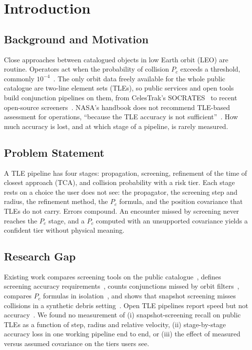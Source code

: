 \documentclass[conference]{IEEEtran}
\begin{document}
\section{Introduction}

\subsection{Background and Motivation}
Close approaches between catalogued objects in low Earth orbit (LEO) are routine. Operators act when the probability of collision $P_c$ exceeds a threshold, commonly $10^{-4}$~\cite{nasa_ca_handbook2020,merz2019}. The only orbit data freely available for the whole public catalogue are two-line element sets (TLEs), so public services and open tools build conjunction pipelines on them, from CelesTrak's SOCRATES~\cite{kelso2005socrates} to recent open-source screeners~\cite{sonawane2026}. NASA's handbook does not recommend TLE-based assessment for operations, ``because the TLE accuracy is not sufficient''~\cite{nasa_ca_handbook2020}. How much accuracy is lost, and at which stage of a pipeline, is rarely measured.

\subsection{Problem Statement}
A TLE pipeline has four stages: propagation, screening, refinement of the time of closest approach (TCA), and collision probability with a risk tier. Each stage rests on a choice the user does not see: the propagator, the screening step and radius, the refinement method, the $P_c$ formula, and the position covariance that TLEs do not carry. Errors compound. An encounter missed by screening never reaches the $P_c$ stage, and a $P_c$ computed with an unsupported covariance yields a confident tier without physical meaning.

\subsection{Research Gap}
Existing work compares screening tools on the public catalogue~\cite{georgeharvey2011}, defines screening accuracy requirements~\cite{auman2025}, counts conjunctions missed by orbit filters~\cite{woodburn2009}, compares $P_c$ formulas in isolation~\cite{alfano2007review,li2022review}, and shows that snapshot screening misses collisions in a synthetic debris setting~\cite{medhin2026}. Open TLE pipelines report speed but not accuracy~\cite{sonawane2026}. We found no measurement of (i) snapshot-screening recall on public TLEs as a function of step, radius and relative velocity, (ii) stage-by-stage accuracy loss in one working pipeline end to end, or (iii) the effect of measured versus assumed covariance on the tiers users see.
\end{document}
